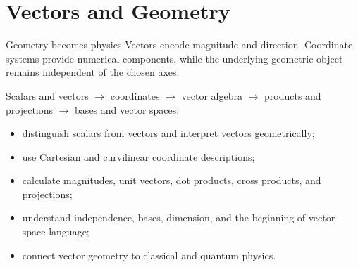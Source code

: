 \chapter{Vectors and Geometry}
\chapteropeningart
{Geometry becomes physics}
{Vectors encode magnitude and direction. Coordinate systems provide numerical components, while the underlying geometric object remains independent of the chosen axes.}
\begin{roadmapbox}
Scalars and vectors $\longrightarrow$ coordinates $\longrightarrow$ vector algebra $\longrightarrow$ products and projections $\longrightarrow$ bases and vector spaces.
\end{roadmapbox}
\learningobjectives
\begin{itemize}
\item distinguish scalars from vectors and interpret vectors geometrically;
\item use Cartesian and curvilinear coordinate descriptions;
\item calculate magnitudes, unit vectors, dot products, cross products, and projections;
\item understand independence, bases, dimension, and the beginning of vector-space language;
\item connect vector geometry to classical and quantum physics.
\end{itemize}
\newpage











